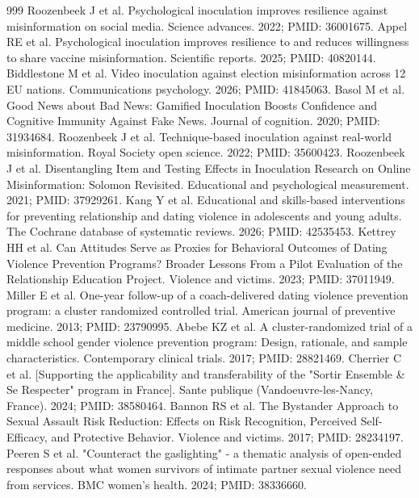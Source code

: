 \begin{thebibliography}{999}
 Roozenbeek J et al. Psychological inoculation improves resilience against misinformation on social media. Science advances. 2022; PMID: 36001675.
 Appel RE et al. Psychological inoculation improves resilience to and reduces willingness to share vaccine misinformation. Scientific reports. 2025; PMID: 40820144.
 Biddlestone M et al. Video inoculation against election misinformation across 12 EU nations. Communications psychology. 2026; PMID: 41845063.
 Basol M et al. Good News about Bad News: Gamified Inoculation Boosts Confidence and Cognitive Immunity Against Fake News. Journal of cognition. 2020; PMID: 31934684.
 Roozenbeek J et al. Technique-based inoculation against real-world misinformation. Royal Society open science. 2022; PMID: 35600423.
 Roozenbeek J et al. Disentangling Item and Testing Effects in Inoculation Research on Online Misinformation: Solomon Revisited. Educational and psychological measurement. 2021; PMID: 37929261.
 Kang Y et al. Educational and skills-based interventions for preventing relationship and dating violence in adolescents and young adults. The Cochrane database of systematic reviews. 2026; PMID: 42535453.
 Kettrey HH et al. Can Attitudes Serve as Proxies for Behavioral Outcomes of Dating Violence Prevention Programs? Broader Lessons From a Pilot Evaluation of the Relationship Education Project. Violence and victims. 2023; PMID: 37011949.
 Miller E et al. One-year follow-up of a coach-delivered dating violence prevention program: a cluster randomized controlled trial. American journal of preventive medicine. 2013; PMID: 23790995.
 Abebe KZ et al. A cluster-randomized trial of a middle school gender violence prevention program: Design, rationale, and sample characteristics. Contemporary clinical trials. 2017; PMID: 28821469.
 Cherrier C et al. [Supporting the applicability and transferability of the "Sortir Ensemble \& Se Respecter" program in France]. Sante publique (Vandoeuvre-les-Nancy, France). 2024; PMID: 38580464.
 Bannon RS et al. The Bystander Approach to Sexual Assault Risk Reduction: Effects on Risk Recognition, Perceived Self-Efficacy, and Protective Behavior. Violence and victims. 2017; PMID: 28234197.
 Peeren S et al. "Counteract the gaslighting" - a thematic analysis of open-ended responses about what women survivors of intimate partner sexual violence need from services. BMC women's health. 2024; PMID: 38336660.

\end{thebibliography}
